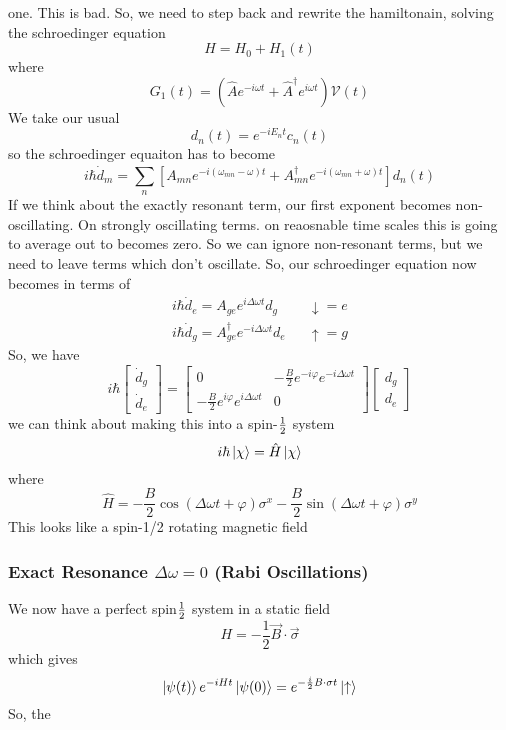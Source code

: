 \documentclass{article}
\theoremstyle{definition}
\begin{document}
one. This is bad. So, we need to step back and rewrite the hamiltonain, solving the schroedinger equation \begin{equation} H=H_0+H_1(t) \end{equation} where \begin{equation} G_1(t)=\left(\hat Ae^{-i\omega t}+\hat A^\dag e^{i\omega t}\right)\mathcal{V}(t) \end{equation} We take our usual \begin{equation} d_n(t)=e^{-iE_nt}c_n(t) \end{equation} so the schroedinger equaiton has to become \begin{equation} i\hbar\dot{d}_m=\sum_{n}^{}\left[A_{mn}e^{-i(\omega_{mn}-\omega)t}+A^\dag_{mn}e^{-i(\omega_{mn}+\omega)t}\right]d_n(t) \end{equation} If we think about the exactly resonant term, our first exponent becomes non-oscillating. On strongly oscillating terms. on reaosnable time scales this is going to average out to becomes zero. So we can ignore non-resonant terms, but we need to leave terms which don't oscillate. So, our schroedinger equation now becomes in terms of \begin{align} i\hbar\dot d_e=A_{ge}e^{i\Delta\omega t}d_g && \downarrow=e \\ i\hbar\dot d_g=A_{ge}^\dag e^{-i\Delta\omega t}d_e && \uparrow=g \end{align} So, we have \begin{equation} i\hbar\begin{bmatrix}\dot d_g\\\dot d_e\end{bmatrix} = \begin{bmatrix} 0 & -\frac{B}{2}e^{-i\varphi}e^{-i\Delta\omega t}\\ -\frac{B}{2}e^{i\varphi} e^{i\Delta\omega t} & 0 \end{bmatrix} \begin{bmatrix}d_g\\d_e\end{bmatrix} \end{equation} we can think about making this into a spin-${1\over 2}$ system \begin{equation} i\hbar\ket{\chi}=\hat H\ket{\chi} \end{equation} where \begin{equation} \hat H=-\frac{B}{2}\cos(\Delta\omega t+\varphi)\sigma^x-\frac{B}{2}\sin(\Delta\omega t+\varphi)\sigma^y \end{equation} This looks like a spin-1/2 rotating magnetic field \subsubsection{Exact Resonance $\Delta\omega=0$ (Rabi Oscillations)} We now have a perfect spin${1\over2}$ system in a static field \begin{equation} H=-\frac{1}{2}\vec{B}\cdot\vec{\sigma} \end{equation} which gives \begin{equation} \ket{\psi(t)}e^{-iHt}\ket{\psi(0)}=e^{-\frac{i}{2}B\cdot\sigma t}\ket{\uparrow} \end{equation} So, the 
\end{document}
